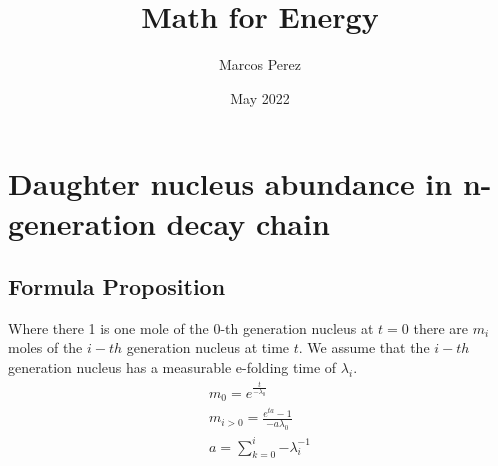 \documentclass[12pt]{article}
\title{Math for Energy}
\author{Marcos Perez}
\date{May 2022}
\begin{document}
\maketitle
\section{Daughter nucleus abundance in n-generation decay chain}
\subsection{Formula Proposition}
Where there 1 is one mole of the 0-th generation nucleus at $t=0$ there are $m_i$ moles of the $i-th$ generation nucleus at time $t$. We assume that the $i-th$ generation nucleus has a measurable e-folding time of $\lambda_i$. 
\begin{equation}
\begin{split}
m_0 = e^{\frac{t}{-\lambda_0}}\\
m_{i>0} = \frac{e^{ta}-1}{-a\lambda_0}\\
a = \sum_{k=0}^{i}{-\lambda_{i}^{-1}}
\end{split}
\end{equation}
\end{document}
